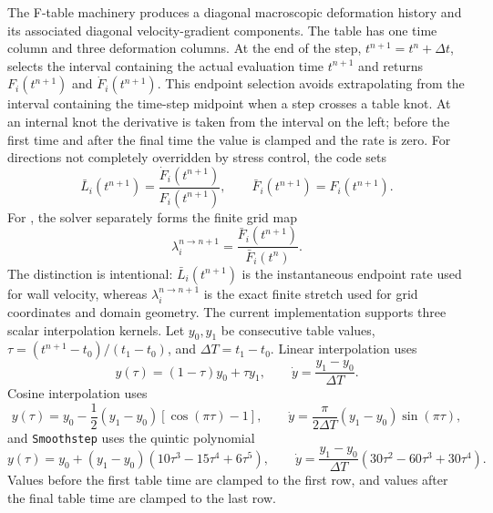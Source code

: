 The F-table machinery produces a diagonal macroscopic deformation history and its associated diagonal velocity-gradient components.  The table has one time column and three deformation columns.  At the end of the step, $t^{n+1}=t^n+\Delta t$,  selects the interval containing the actual evaluation time $t^{n+1}$ and returns $F_i(t^{n+1})$ and $\dot F_i(t^{n+1})$.  This endpoint selection avoids extrapolating from the interval containing the time-step midpoint when a step crosses a table knot.  At an internal knot the derivative is taken from the interval on the left; before the first time and after the final time the value is clamped and the rate is zero.  For directions not completely overridden by stress control, the code sets
\begin{equation}
  \bar L_i(t^{n+1}) = \frac{\dot F_i(t^{n+1})}{F_i(t^{n+1})},
  \qquad
  \bar F_i(t^{n+1}) = F_i(t^{n+1}).
  \label{eq:bc-ftable-l}
\end{equation}
For , the solver separately forms the finite grid map
\begin{equation}
  \lambda_i^{n\rightarrow n+1}
  = \frac{\bar F_i(t^{n+1})}{\bar F_i(t^n)}.
  \label{eq:bc-ftable-incremental-stretch}
\end{equation}
The distinction is intentional: $\bar L_i(t^{n+1})$ is the instantaneous endpoint rate used for wall velocity, whereas $\lambda_i^{n\rightarrow n+1}$ is the exact finite stretch used for grid coordinates and domain geometry.
The current implementation supports three scalar interpolation kernels.  Let $y_0,y_1$ be consecutive table values, $\tau=(t^{n+1}-t_0)/(t_1-t_0)$, and $\Delta T=t_1-t_0$.  Linear interpolation uses
\begin{equation}
  y(\tau)=(1-\tau)y_0+\tau y_1,
  \qquad
  \dot y=\frac{y_1-y_0}{\Delta T}.
\end{equation}
Cosine interpolation uses
\begin{equation}
  y(\tau)=y_0-\frac{1}{2}(y_1-y_0)\left[\cos(\pi\tau)-1\right],
  \qquad
  \dot y=\frac{\pi}{2\Delta T}(y_1-y_0)\sin(\pi\tau),
\end{equation}
and \texttt{Smoothstep} uses the quintic polynomial
\begin{equation}
  y(\tau)=y_0+(y_1-y_0)(10\tau^3-15\tau^4+6\tau^5),
  \qquad
  \dot y=\frac{y_1-y_0}{\Delta T}(30\tau^2-60\tau^3+30\tau^4).
\end{equation}
Values before the first table time are clamped to the first row, and values after the final table time are clamped to the last row.

